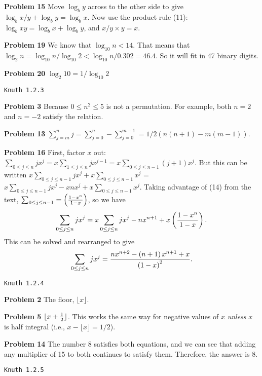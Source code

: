 \vskip 0.1in
\noindent
{\bf Problem 15} Move $\log_b y$ across to the other side to give $\log_b x/y + \log_b y = \log_b x$.
 Now use the product rule (11): $\log_b xy = \log_b x + \log_b y$, and $x/y \times y = x$.

\vskip 0.1in
\noindent
{\bf Problem 19} We know that $\log_{10} n < 14$.  That means that $\log_2 n = \log_{10} n /
  \log_{10} 2 < \log_{10} n / 0.302 = 46.4$.  So it will fit in 47 binary digits.

\vskip 0.1in
\noindent
{\bf Problem 20} $\log_2 10 = 1 / \log_{10} 2$

\vskip 0.5in
\centerline{\tt Knuth 1.2.3}
\vskip 0.5in

\noindent
{\bf Problem 3} Because $0 \le n^2 \le 5$ is not a permutation.  For example, both $n=2$ and $n=-2$
 satisfy the relation.
 
\vskip 0.1in
\noindent
{\bf Problem 13} $\sum_{j=m}^{n} j = \sum_{j=0}^{n} - \sum_{j=0}^{m-1} = 1/2 \left( n \left(n+1\right) -
   m \left(m-1\right) \right)$.
   
\vskip 0.1in
\noindent
{\bf Problem 16} First, factor $x$ out: $\sum_{0 \le j \le n} j x^j = x \sum_{1 \le j \le n} j x^{j-1} =
 x \sum_{0 \le j \le n-1} \left(j + 1 \right) x^j$. But this can be written 
 $x \sum_{0 \le j \le n-1} j x^j + x \sum_{0 \le j \le n-1} x^j$ = $x \sum_{0 \le j \le n-1} j x^j - x n x^j
 + x \sum_{0 \le j \le n-1} x^j$.  Taking advantage of (14) from the text, $ \sum_{0 \le j \le n-1} =
  \left( { 1 - x^n } \over 1 - x \right)$, so we have 
  $$ \sum_{0 \le j \le n} j x^j = x \sum_{0 \le j \le n} j x^j - n x^{n+1} + x \left( { 1 - x^n} \over 1-x \right).$$
 This can be solved and rearranged to give
 $$ 
   \sum_{0 \le j \le n} j x^j = {n x^{n+2} - \left( n + 1 \right) x^{n+1} + x \over \left( 1 - x \right)^2}.
 $$

\vskip 0.5in
\centerline{\tt Knuth 1.2.4}
\vskip 0.5in

\noindent
{\bf Problem 2} The floor, $\lfloor x \rfloor$.

\vskip 0.1in
\noindent
{\bf Problem 5} $\lfloor x + {1 \over 2} \rfloor$.  This works the same way for negative
 values of $x$ {\it unless} $x$ is half integral (i.e., $x - \lfloor x \rfloor = 1/2$).

\vskip 0.1in
\noindent
{\bf Problem 14} The number 8 satisfies both equations, and we can see that adding
 any multiplier of 15 to both continues to satisfy them.  Therefore, the answer is 8.
 
\vskip 0.5in
\centerline{\tt Knuth 1.2.5}
\vskip 0.5in


